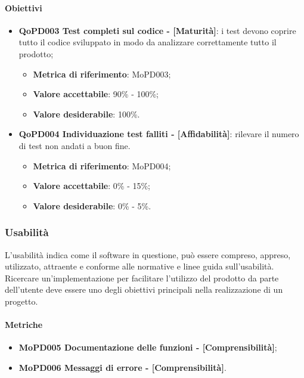 \documentclass[../piano-di-qualifica.tex]{subfiles}
\begin{document}
\paragraph{Obiettivi}
\label{sub:obiettivi}
\begin{itemize}
    \item \textbf{QoPD003 Test completi sul codice - [Maturità]}: i test devono coprire tutto il codice sviluppato in modo da analizzare correttamente tutto il prodotto;
        \begin{itemize}
            \item \textbf{Metrica di riferimento}: MoPD003;
            \item \textbf{Valore accettabile}: 90\% - 100\%;
            \item \textbf{Valore desiderabile}: 100\%.
        \end{itemize}
    \item \textbf{QoPD004 Individuazione test falliti - [Affidabilità]}: rilevare il numero di test non andati a buon fine.
        \begin{itemize}
            \item \textbf{Metrica di riferimento}: MoPD004;
            \item \textbf{Valore accettabile}: 0\% - 15\%;
            \item \textbf{Valore desiderabile}: 0\% - 5\%.
        \end{itemize}
\end{itemize}

\subsubsection{Usabilità}%
\label{sub:usabilita}
L'usabilità indica come il software in questione, può essere compreso, appreso, utilizzato, attraente e conforme alle normative e linee guida sull'usabilità.
Ricercare un'implementazione per facilitare l'utilizzo del prodotto da parte dell'utente deve essere uno degli obiettivi principali nella realizzazione di un progetto.

\paragraph{Metriche}
\label{sub:metriche}
\begin{itemize}
    \item \textbf{MoPD005 Documentazione delle funzioni - [Comprensibilità]};
    \item \textbf{MoPD006 Messaggi di errore - [Comprensibilità]}.
\end{itemize}
\end{document}
